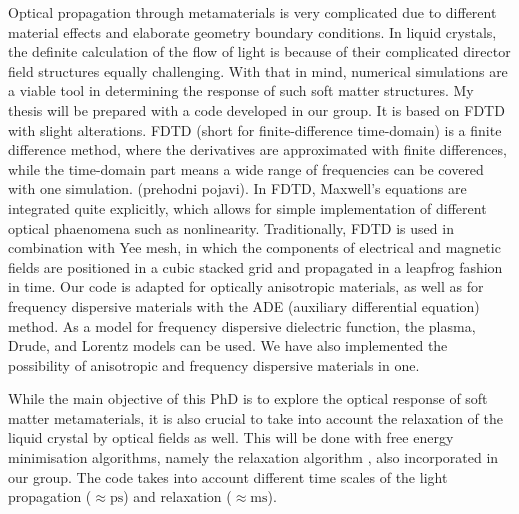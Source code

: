 \documentclass[a4paper,11pt]{article}
\begin{document}

Optical propagation through metamaterials is very complicated due to different material effects and elaborate geometry boundary conditions. 
In liquid crystals, the definite calculation of the flow of light is because of their complicated director field structures equally challenging.
With that in mind, numerical simulations are a viable tool in determining the response of such soft matter structures. 
My thesis will be prepared with a code developed in our group. 
It is based on FDTD with slight alterations. 
FDTD (short for finite-difference time-domain) is a finite difference method, where the derivatives are approximated with finite differences, while the time-domain part means a wide range of frequencies can be covered with one simulation. (prehodni pojavi). 
In FDTD, Maxwell's equations are integrated quite explicitly, which allows for simple implementation of different optical phaenomena such as nonlinearity. 
Traditionally, FDTD is used in combination with Yee mesh, in which the components of electrical and magnetic fields are positioned in a cubic stacked grid and propagated in a leapfrog fashion in time. 
Our code is adapted for optically anisotropic materials, as well as for frequency dispersive materials with the ADE (auxiliary differential equation) method. 
As a model for frequency dispersive dielectric function, the plasma, Drude, and Lorentz models can be used. 
We have also implemented the possibility of anisotropic and frequency dispersive materials in one. 

While the main objective of this PhD is to explore the optical response of soft matter metamaterials, it is also crucial to take into account the relaxation of the liquid crystal by optical fields as well. 
This will be done with free energy minimisation algorithms, namely the relaxation algorithm \cite{ravnik}, also incorporated in our group. 
The code takes into account different time scales of the light propagation ($\approx \mathrm{ps}$) and relaxation ($\approx \mathrm{ms}$). 

\end{document}
